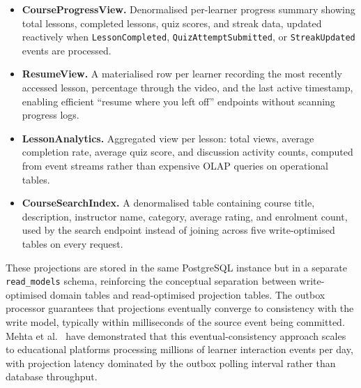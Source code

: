 \begin{itemize}
  \item \textbf{CourseProgressView.} Denormalised per-learner progress summary showing total lessons, completed lessons, quiz scores, and streak data, updated reactively when \texttt{LessonCompleted}, \texttt{QuizAttemptSubmitted}, or \texttt{StreakUpdated} events are processed.
  \item \textbf{ResumeView.} A materialised row per learner recording the most recently accessed lesson, percentage through the video, and the last active timestamp, enabling efficient ``resume where you left off'' endpoints without scanning progress logs.
  \item \textbf{LessonAnalytics.} Aggregated view per lesson: total views, average completion rate, average quiz score, and discussion activity counts, computed from event streams rather than expensive OLAP queries on operational tables.
  \item \textbf{CourseSearchIndex.} A denormalised table containing course title, description, instructor name, category, average rating, and enrolment count, used by the search endpoint instead of joining across five write-optimised tables on every request.
\end{itemize}

These projections are stored in the same PostgreSQL instance but in a separate \texttt{read\_models} schema, reinforcing the conceptual separation between write-optimised domain tables and read-optimised projection tables. The outbox processor guarantees that projections eventually converge to consistency with the write model, typically within milliseconds of the source event being committed. Mehta et al.~\cite{mehta2023eda} have demonstrated that this eventual-consistency approach scales to educational platforms processing millions of learner interaction events per day, with projection latency dominated by the outbox polling interval rather than database throughput.
